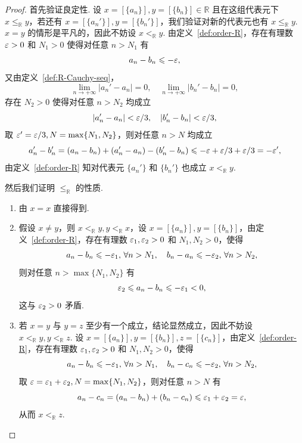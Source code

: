 \documentclass[../main.tex]{subfiles}
\begin{document}
\begin{proof}
    首先验证良定性. 设 $x = [\{a_n\}], y = [\{b_n\}] \in \mathbb R$ 且在这组代表元下 $x \leqslant_\mathbb R y$，若还有 $x = [\{a_n'\}], y = [\{b_n'\}]$，我们验证对新的代表元也有 $x \leqslant_\mathbb R y$. $x = y$ 的情形是平凡的，因此不妨设 $x <_\mathbb R y$. 由定义~\ref{def:order-R}，存在有理数 $\varepsilon > 0$ 和 $N_1 > 0$ 使得对任意 $n > N_1$ 有 
    $$
    a_n - b_n \leqslant -\varepsilon, 
    $$
    又由定义~\ref{def:R-Cauchy-seq}，
    $$
    \lim\limits_{n \to +\infty} |a_n' - a_n| = 0, \quad \lim\limits_{n \to +\infty} |b_n' - b_n| = 0, 
    $$
    存在 $N_2 > 0$ 使得对任意 $n > N_2$ 均成立
    $$
    |a_n' - a_n| < \varepsilon / 3, \quad |b_n' - b_n| < \varepsilon / 3, 
    $$
    取 $\varepsilon' = \varepsilon / 3, N = \max\{N_1, N_2\}$，则对任意 $n > N$ 均成立
    $$
    a_n' - b_n' = (a_n - b_n) + (a_n' - a_n) - (b_n' - b_n) \leqslant -\varepsilon + \varepsilon / 3 + \varepsilon / 3 = -\varepsilon', 
    $$
    由定义~\ref{def:order-R} 知对代表元 $\{a_n'\}$ 和 $\{b_n'\}$ 也成立 $x <_\mathbb R y$. 

    然后我们证明 $\leqslant_\mathbb R$ 的性质. 

    \begin{enumerate}[label=(\alph*)]
        \item 由 $x = x$ 直接得到. 
        \item 假设 $x \neq y$，则 $x <_\mathbb R y, y <_\mathbb R x$，设 $x = [\{a_n\}], y = [\{b_n\}]$，由定义~\ref{def:order-R}，存在有理数 $\varepsilon_1, \varepsilon_2 > 0$ 和 $N_1, N_2 > 0$，使得
        $$
        a_n - b_n \leqslant -\varepsilon_1,\, \forall n > N_1,\quad b_n - a_n \leqslant -\varepsilon_2,\, \forall n > N_2, 
        $$
        则对任意 $n > \max\{N_1, N_2\}$ 有 
        $$
        \varepsilon_2 \leqslant a_n - b_n \leqslant -\varepsilon_1 < 0, 
        $$
        这与 $\varepsilon_2 > 0$ 矛盾. 

        \item 若 $x = y$ 与 $y = z$ 至少有一个成立，结论显然成立，因此不妨设 $x <_\mathbb R y, y <_\mathbb R z$. 设 $x = [\{a_n\}], y = [\{b_n\}], z = [\{c_n\}]$，由定义~\ref{def:order-R}，存在有理数 $\varepsilon_1, \varepsilon_2 > 0$ 和 $N_1, N_2 > 0$，使得
        $$
        a_n - b_n \leqslant -\varepsilon_1,\, \forall n > N_1,\quad b_n - c_n \leqslant -\varepsilon_2,\, \forall n > N_2, 
        $$
        取 $\varepsilon = \varepsilon_1 + \varepsilon_2, N = \max\{N_1, N_2\}$，则对任意 $n > N$ 有 
        $$
        a_n - c_n  = (a_n - b_n) + (b_n - c_n) \leqslant \varepsilon_1 + \varepsilon_2 = \varepsilon, 
        $$
        从而 $x <_\mathbb R z$. 


\end{enumerate}
\end{proof}
\end{document}
